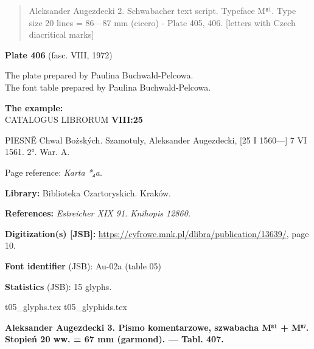 \documentclass[12pt]{article}
\newcommand{\bg}{\begingl}
\newcommand{\pismoPL}[1]{{\relsize{2}\Junicode\textbf{#1}}}
\newcommand{\pismoEN}[1]{{\relsize{1}\Junicode\begin{quote}#1\end{quote}}}
\newcommand{\plate}[3]{\textbf{Plate #1} (fasc. #2, #3)}
\newcommand{\exampleBib}[1]{{\relsize{2}\Junicode\textbf{The
      example:}\\[2ex] CATALOGUS LIBRORUM \textbf{#1}}}
\newcommand{\exampleDesc}[1]{{\relsize{0}\Junicode#1}}
\newcommand{\exampleDig}[1]{{\relsize{0}\Junicode \textbf{Digitization(s) [JSB]:} #1}}
\newcommand{\exampleLib}[1]{{\relsize{0}\Junicode \textbf{Library:} #1}}
\newcommand{\examplePL}[1]{}
\newcommand{\exampleEN}[1]{}
\newcommand{\fontID}[2]{{\relsize{1}\Junicode\textbf{Font identifier} (JSB): #1 (table #2)}}
\newcommand{\fontstat}[1]{{\relsize{1}\Junicode\textbf{Statistics} (JSB): #1 glyphs.}}
\newcommand{\exampleRef}[1]{{\relsize{0}\Junicode \textbf{References:} #1}}
\newcommand{\examplePage}[1]{{Page reference: \relsize{0}\Junicode#1}}
\begin{document}
\pismoEN{Aleksander Augezdecki 2. Schwabacher text script. Typeface
  M⁸¹. Type size 20 lines = 86—87 mm (cicero) - Plate 405,
  406. [letters with Czech diacritical marks]}

\medskip

\plate{406}{VIII}{1972}

The plate    prepared by Paulina Buchwald-Pelcowa.\\
The font table    prepared by Paulina Buchwald-Pelcowa.\\


\bigskip

\exampleBib{VIII:25}

\bigskip
\exampleDesc{PIESNĚ Chwal Bożských. Szamotuly, Aleksander Augezdecki, [25 I 1560—] 7 VI 1561. 2°. War. A.}

\medskip
\examplePage{\textit{Karta *₄a.}}

  \bigskip
\exampleLib{Biblioteka Czartoryskich. Kraków.}

\bigskip
\exampleRef{\textit{Estreicher XIX 91. Knihopis 12860.}}

\bigskip
\exampleDig{\url{https://cyfrowe.mnk.pl/dlibra/publication/13639/}, page 10.}

\medskip

    \examplePL{Pismo 2: tekst i zestaw liter ze znakami diakrytycznymi czeskimi.}

    \medskip

    \exampleEN{Font 2. The text and the table including letters with Czech diacritical marks.}


\bigskip

    \fontID{Au-02a}{05}

    \fontstat{15}

\bigskip


 {t05_glyphs.tex}
 {t05_glyphids.tex}


\newpage


\pismoPL{Aleksander Augezdecki 3. Pismo komentarzowe, szwabacha M⁸¹ + M⁸⁷. Stopień 20 ww. = 67 mm (garmond). — Tabl. 407.}
\end{document}
